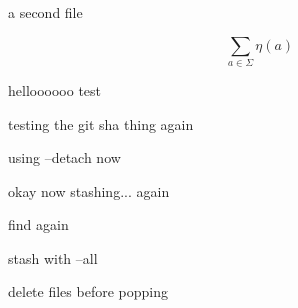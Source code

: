 \documentclass{article}
\begin{document}
a second file

\[
    \sum_{a\in\Sigma} \eta(a)
\]

helloooooo test

testing the git sha thing again

using --detach now

okay now stashing... again

find again

stash with --all

delete files before popping
\end{document}
